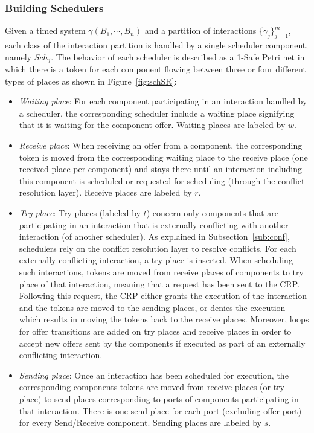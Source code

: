 \subsubsection{Building Schedulers}
  Given a timed system $\gamma(B_1,\cdots,B_n)$ and a partition of interactions 
  $\{\gamma_j\}^m_{j=1}$, each class of the interaction partition is handled by a single
  scheduler component, namely $Sch_j$.
  The behavior of each scheduler is described as a 1-Safe Petri net in which there is a token
  for each component flowing between three or four different types of places as shown
  in Figure~\ref{fig:schSR}:
  
  \begin{itemize}
    \item \emph{Waiting place}: For each component participating in an interaction handled by
      a scheduler, the corresponding scheduler include a waiting place signifying that 
      it is waiting for the component offer. Waiting places are labeled by $w$. 
    \item \emph{Receive place}: When receiving an offer from a component, the corresponding
      token is moved from the corresponding waiting place to the receive place (one received
      place per component) and stays there until an interaction including this component is 
      scheduled or requested for scheduling (through the conflict resolution layer). 
      Receive places are labeled by $r$.
    \item \emph{Try place}: Try places (labeled by $t$) 
      concern only components that are participating in an interaction that is externally
      conflicting with another interaction (of another scheduler). 
      As explained in Subsection~\ref{sub:conf}, schedulers
      rely on the conflict resolution layer to resolve conflicts. For each externally
      conflicting interaction, a try place is inserted. When scheduling such interactions,
      tokens are moved from receive places of components to try place of that interaction, 
      meaning that a request has been sent to the CRP. Following this request, the CRP 
      either grants the execution
      of the interaction and the tokens are moved to the sending places, or denies the execution
      which results in moving the tokens back to the receive places.
      Moreover, loops for offer transitions are added on try places and receive places
      in order to accept new offers sent by the components if executed as part of an externally
      conflicting interaction.
    \item \emph{Sending place}: Once an interaction has been scheduled for execution,
      the corresponding components tokens are moved from receive places (or try place) to
      send places corresponding to ports of components participating in that interaction. 
      There is one send place for each port (excluding offer port) 
      for every Send/Receive component.
      Sending places are labeled by $s$.
  \end{itemize}
